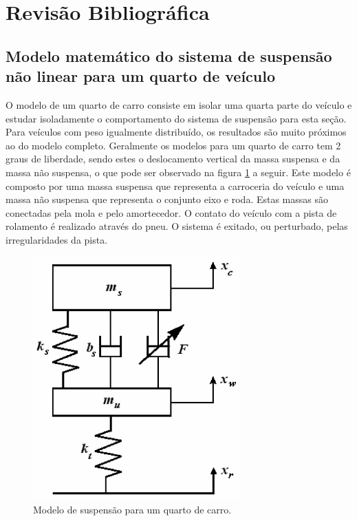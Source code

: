 \documentclass[a4paper]{ifacconf}
\begin{document}
    \section{Revisão Bibliográfica}
        \subsection{Modelo matemático do sistema de suspensão não linear para um quarto de veículo }
    O modelo de um quarto de carro consiste em isolar uma quarta parte do veículo e estudar isoladamente o comportamento do sistema de suspensão para esta seção. Para veículos com peso igualmente distribuído, os resultados são muito próximos ao do modelo completo. Geralmente os modelos para um quarto de carro tem 2 graus de liberdade, sendo estes o deslocamento vertical da massa suspensa e da massa não suspensa, o que pode ser observado na figura \ref{fig:massa_mola_nao_linear_controlavel} a seguir. Este modelo é composto por uma massa suspensa que representa a carroceria do veículo e uma massa não suspensa que representa o conjunto eixo e roda. Estas massas são conectadas pela mola e pelo amortecedor. O contato do veículo com a pista de rolamento é realizado através do pneu. O sistema é exitado, ou perturbado, pelas irregularidades da pista.
    \FloatBarrier
    \begin{figure}[htbp]
        \begin{centering}
            \includegraphics[width=8cm]{img/massa_mola_nao_linear_controlavel.png}
            \caption{Modelo de suspensão para um quarto de carro.} 
            \label{fig:massa_mola_nao_linear_controlavel}
        \end{centering}
    \end{figure}
\end{document}
